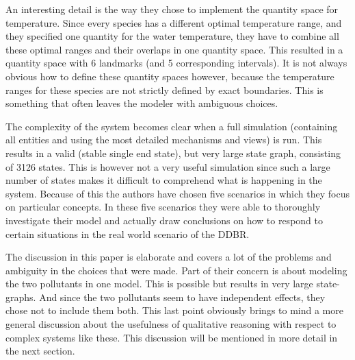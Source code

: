 \documentclass{article} %
\begin{document}
An interesting detail is the way they chose to implement the quantity space for
temperature. Since every species has a different optimal temperature range, and
they specified one quantity for the water temperature, they have to combine all
these optimal ranges and their overlaps in one quantity space. This resulted in
a quantity space with 6 landmarks (and 5 corresponding intervals). It is not
always obvious how to define these quantity spaces however, because the
temperature ranges for these species are not strictly defined by exact
boundaries. This is something that often leaves the modeler with ambiguous
choices.

\vspace{0.8 em}

The complexity of the system becomes clear when a full simulation (containing
all entities and using the most detailed mechanisms and views) is run. This
results in a valid (stable single end state), but very large state graph,
consisting of 3126 states. This is however not a very useful simulation since
such a large number of states makes it difficult to comprehend what is
happening in the system. Because of this the authors have chosen five scenarios
in which they focus on particular concepts. In these five scenarios they were
able to thoroughly investigate their model and actually draw conclusions on how
to respond to certain situations in the real world scenario of the DDBR.

\vspace{0.8em}

The discussion in this paper is elaborate and covers a lot of the problems and
ambiguity in the choices that were made. Part of their concern is about modeling
the two pollutants in one model. This is possible but results in very large
state-graphs. And since the two pollutants seem to have independent effects,
they chose not to include them both.
This last point obviously brings to mind a more general discussion about the
usefulness of qualitative reasoning with respect to complex systems like these.
This discussion will be mentioned in more detail in the next section.
\end{document}
